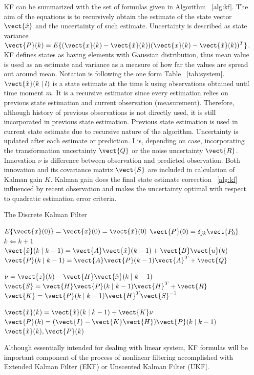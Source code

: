 KF can be summarized with the set of formulas given in Algorithm ~\ref{alg:kf}. The aim of the equations is to recursively obtain the estimate of the state vector ${\vect{\hat{x}}}$ and the uncertainty of such estimate. Uncertainty is described as state variance $\vect{P}(k) = E\lbrace (\vect{x}(k) - \vect{\hat{x}}(k)) (\vect{x}(k) - \vect{\hat{x}}(k))^{T} \rbrace$. KF defines states as having elements with Gaussian distribution, thus mean value is used as an estimate and variance as a measure of how far the values are spread out around mean. Notation is following the one form Table ~\ref{tab:system}. $\vect{\hat{x}}(k \mid l)$ is a state estimate at the time k using observations obtained until time moment $m$. It is a recursive estimator since every estimation relies on previous state estimation and current observation (measurement). Therefore, although history of previous observations is not directly used, it is still incorporated in previous state estimation. Previous state estimation is used in current state estimate due to recursive nature of the algorithm. Uncertainty is updated after each estimate or prediction. I is, depending on case, incorporating the transformation uncertainty $\vect{Q}$ or the noise uncertainty $\vect{R}$. Innovation $\nu$ is difference between observation and predicted observation. Both innovation and its covariance matrix $\vect{S}$ are included in calculation of Kalman gain $K$. Kalman gain does the final state estimate correction ~\ref{alg:kf} influenced by recent observation and makes the uncertainty optimal with respect to quadratic estimation error criteria.
\begin{algorithm}%
\caption{The Discrete Kalman Filter} \label{alg:kf}
\begin{algorithmic}
\REQUIRE $E\lbrace \vect{x}(0) \rbrace = \vect{x}(0) = \vect{\hat{x}}(0)$
\REQUIRE $\vect{P}(0) = \delta_{jk} \vect{P_{0}} $ 
\LOOP 
	\STATE $k \Leftarrow k+1$ 
	\STATE $\vect{\hat{x}}(k \mid k-1) = \vect{A} \vect{\hat{x}}(k-1) + \vect{B} \vect{u}(k)$
	\STATE $\vect{P}(k \mid k-1) = \vect{A} \vect{P}(k-1) \vect{A}^{T} + \vect{Q}$
	
	\STATE $\nu = \vect{z}(k) - \vect{H} \vect{\hat{x}}(k \mid k-1)$	
	\STATE $\vect{S} = \vect{H} \vect{P}(k \mid k-1) \vect{H}^{T} + \vect{R}$	
	\STATE $\vect{K} = \vect{P}(k \mid k-1) \vect{H}^{T} \vect{S}^{-1}$	
	
	\STATE $\vect{\hat{x}}(k) = \vect{\hat{x}}(k \mid k-1) + \vect{K} \nu$
	\STATE $\vect{P}(k) = (\vect{I}-\vect{K}\vect{H})\vect{P}(k \mid k-1)$
	\RETURN $\vect{\hat{x}}(k), \vect{P}(k)$
\ENDLOOP
\end{algorithmic}
\end{algorithm}
Although essentially intended for dealing with linear system, KF formulas will be important component of the process of nonlinear filtering accomplished with Extended Kalman Filter (EKF) or Unscented Kalman Filter (UKF). 
